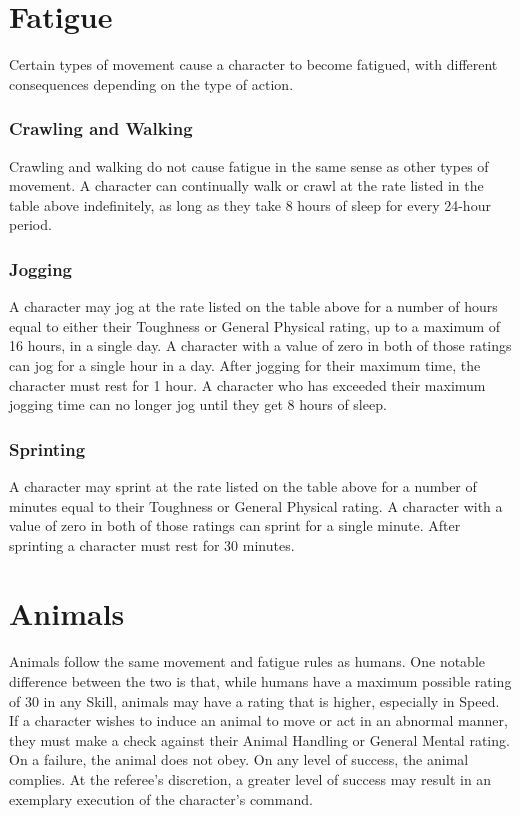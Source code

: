 \documentclass[oneside]{book}
\begin{document}
\begin{multicols}{2}
\section{Fatigue}
Certain types of movement cause a character to become fatigued, with different consequences depending on the type of action. 

\subsubsection{Crawling and Walking}
Crawling and walking do not cause fatigue in the same sense as other types of movement. A character can continually walk or crawl at the rate listed in the table above indefinitely, as long as they take 8 hours of sleep for every 24-hour period. 

\subsubsection{Jogging}
A character may jog at the rate listed on the table above for a number of hours equal to either their Toughness or General Physical rating, up to a maximum of 16 hours, in a single day. A character with a value of zero in both of those ratings can jog for a single hour in a day. After jogging for their maximum time, the character must rest for 1 hour. A character who has exceeded their maximum jogging time can no longer jog until they get 8 hours of sleep. 

\subsubsection{Sprinting}
A character may sprint at the rate listed on the table above for a number of minutes equal to their Toughness or General Physical rating. A character with a value of zero in both of those ratings can sprint for a single minute. After sprinting a character must rest for 30 minutes. 

\section{Animals}
Animals follow the same movement and fatigue rules as humans. One notable difference between the two is that, while humans have a maximum possible rating of 30 in any Skill, animals may have a rating that is higher, especially in Speed. If a character wishes to induce an animal to move or act in an abnormal manner, they must make a check against their Animal Handling or General Mental rating. On a failure, the animal does not obey. On any level of success, the animal complies. At the referee's discretion, a greater level of success may result in an exemplary execution of the character's command. 


\end{multicols}
\end{document}
